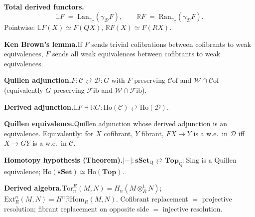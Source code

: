 \begin{formalrestatement}
\textbf{Total derived functors.}\quad
\begin{equation*}
  \mathbb{L} F \;=\; \mathrm{Lan}_{\gamma_{\mathcal{C}}} (\gamma_{\mathcal{D}} F), \qquad
  \mathbb{R} F \;=\; \mathrm{Ran}_{\gamma_{\mathcal{C}}} (\gamma_{\mathcal{D}} F).
\end{equation*}
Pointwise:
$\mathbb{L} F (X) \simeq F(QX)$, $\mathbb{R} F(X) \simeq F(RX)$.

\medskip
\textbf{Ken Brown's lemma.}\quad If $F$ sends trivial cofibrations between
cofibrants to weak equivalences, $F$ sends all weak equivalences between
cofibrants to weak equivalences.

\medskip
\textbf{Quillen adjunction.}\quad $F : \mathcal{C} \rightleftarrows
\mathcal{D} : G$ with $F$ preserving $\mathcal{C}\mathrm{of}$ and
$\mathcal{W} \cap \mathcal{C}\mathrm{of}$ (equivalently $G$ preserving
$\mathcal{F}\mathrm{ib}$ and $\mathcal{W} \cap \mathcal{F}\mathrm{ib}$).

\medskip
\textbf{Derived adjunction.}\quad $\mathbb{L} F \dashv \mathbb{R} G :
\mathrm{Ho}(\mathcal{C}) \rightleftarrows \mathrm{Ho}(\mathcal{D})$.

\medskip
\textbf{Quillen equivalence.}\quad Quillen adjunction whose derived
adjunction is an equivalence. Equivalently: for $X$ cofibrant, $Y$
fibrant, $FX \to Y$ is a w.e.\ in $\mathcal{D}$ iff $X \to GY$ is a w.e.\
in $\mathcal{C}$.

\medskip
\textbf{Homotopy hypothesis (Theorem).}\quad $\lvert{-}\rvert :
\mathbf{sSet}_{\mathrm{Q}} \rightleftarrows \mathbf{Top}_{\mathrm{Q}} :
\mathrm{Sing}$ is a Quillen equivalence; $\mathrm{Ho}(\mathbf{sSet})
\simeq \mathrm{Ho}(\mathbf{Top})$.

\medskip
\textbf{Derived algebra.}\quad $\mathrm{Tor}_n^R(M, N) = H_n(M \otimes_R^{\mathbb{L}} N)$;
$\mathrm{Ext}_R^n(M, N) = H^n \mathbb{R}\mathrm{Hom}_R(M, N)$. Cofibrant
replacement $=$ projective resolution; fibrant replacement on opposite
side $=$ injective resolution.
\end{formalrestatement}

